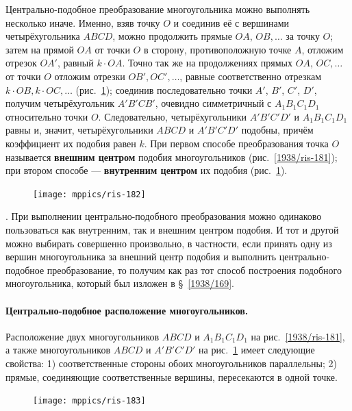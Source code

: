 \documentclass[oneside]{book}
\makeatletter
\newcommand{\rindex}[2][\imki@jobname]{%
  \index[#1]{\detokenize{#2}}%
}
\makeatother
\begin{document}
Центрально-подобное преобразование многоугольника можно выполнять несколько иначе.
Именно, взяв точку $O$ и соединив её с вершинами четырёхугольника $ABCD$, можно продолжить прямые $OA$, $OB,\dots$
за точку $O$;
затем на прямой $OA$ от точки $O$ в сторону, противоположную точке $A$, отложим отрезок $OA'$, равный $k\cdot OA$.
Точно так же на продолжениях прямых $OA$, $OC,\dots$
от точки $O$ отложим отрезки $OB', OC',\dots$, равные соответственно отрезкам $k\cdot OB, k\cdot OC,\dots$
(рис.~\ref{1938/ris-182});
соединив последовательно точки $A'$, $B'$, $C'$, $D'$, получим четырёхугольник $A'B'CB'$, очевидно симметричный с $A_1B_1C_1D_1$ относительно точки $O$.
Следовательно, четырёхугольники $A'B'C'D'$ и $A_1B_1C_1D_1$ равны и, значит, четырёхугольники $ABCD$ и $A'B'C'D'$ подобны, причём коэффициент их подобия равен $k$.
При первом способе преобразования точка $O$ называется \rindex{внешний центр}\textbf{внешним центром} подобия многоугольников (рис.~\ref{1938/ris-181});
при втором способе — \rindex{внутренний центр}\textbf{внутренним центром} их подобия (рис.~\ref{1938/ris-182}).

\begin{figure}[h]
\centering
\texttt{[image: mppics/ris-182]}
\caption{}\label{1938/ris-182}
\end{figure}

\smallskip
{}.
При выполнении центрально-подобного преобразования можно одинаково пользоваться как внутренним, так и внешним центром подобия.
И тот и другой можно выбирать совершенно произвольно, в частности, если принять одну из вершин многоугольника за внешний центр подобия и выполнить центрально-подобное преобразование, то получим как раз тот способ построения подобного многоугольника, который был изложен в §~\ref{1938/169}.

\paragraph{Центрально-подобное расположение многоугольников.}\label{1938/176}
Расположение двух многоугольников $ABCD$ и $A_1B_1C_1D_1$ на рис.~\ref{1938/ris-181}, а также многоугольников $ABCD$ и $A'B'C'D'$ на рис.~\ref{1938/ris-182} имеет следующие свойства:
1) соответственные стороны обоих многоугольников параллельны;
2) прямые, соединяющие соответственные вершины, пересекаются в одной точке.

\begin{figure}[h]
\centering
\texttt{[image: mppics/ris-183]}
\caption{}\label{1938/ris-183}
\end{figure}
\end{document}
